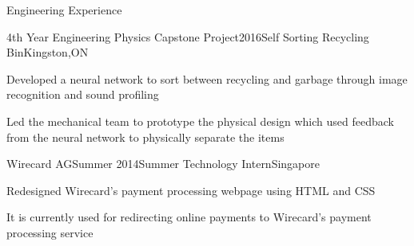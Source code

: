 \documentclass{resume2} %
\begin{document}

\begin{rSection}{Engineering Experience}
	
	\begin{rSubsection}{4th Year Engineering Physics Capstone Project}{2016}{Self Sorting Recycling Bin}{Kingston,ON}
		\item Developed a neural network to sort between recycling and garbage through image recognition and sound profiling
		\item Led the mechanical team to prototype the physical design which used feedback from the neural network to physically separate the items 
	\end{rSubsection}
\iffalse
	\begin{rSubsection}{Engineering Physics Design Project}{2015}{Photodiode Research Sensor}{}
		\item Designed and fabricated a research sensor used to assess the properties of photodiodes. Information gathered included efficiency, current and voltage under illuminated and darkened conditions using an Arduino, Matlab and LabVIEW
	\end{rSubsection}

	\begin{rSubsection}{Engineering Design and Practice II}{2014}{Nuclear Waste Gamma Radiation Detector}{Kingston,ON}
		\item Prototyped a Nuclear Waste Gamma Radiation Detector. Through the process of material selection and decision making, the final product was designed for use in areas surrounding the Deep Geologic Repository in Ontario
	\end{rSubsection}
\fi
	\begin{rSubsection}{Wirecard AG}{Summer 2014}{Summer Technology Intern}{Singapore}
	\item Redesigned Wirecard's payment processing webpage using HTML and CSS
	\item It is currently used for redirecting online payments to Wirecard's payment processing service	
	\end{rSubsection}

\end{rSection}
\end{document}
